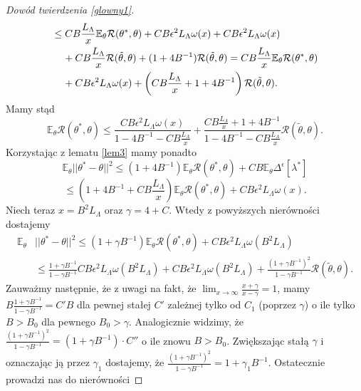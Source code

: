 \documentclass[man,mfiu]{mgrwms}
\begin{document}
\begin{proof}[Dowód twierdzenia \ref{glowny1}]
\begin{displaymath}
\begin{split}
&\leq CB\frac{L_{\Lambda}}{x}\mathbb{E}_{\theta}\mathcal{R}(\theta^*,\theta)+CB\epsilon^2L_{\Lambda}\omega (x)
+CB\epsilon^2L_{\Lambda}\omega (x)\\
&\hspace{4mm}+CB\frac{L_{\Lambda}}{x}\mathcal{R}(\tilde{\theta},\theta)+(1+4B^{-1})\mathcal{R}(\tilde{\theta},\theta)
=CB\frac{L_{\Lambda}}{x}\mathbb{E}_{\theta}\mathcal{R}(\theta^*,\theta)\\
&\hspace{4mm}+CB\epsilon^2L_{\Lambda}\omega (x)+\left(CB\frac{L_{\Lambda}}{x}+1+4B^{-1}\right)\mathcal{R}(\tilde{\theta},\theta).
\end{split}
\end{displaymath}
Mamy stąd
\begin{displaymath}
\mathbb{E}_{\theta}\mathcal{R}(\theta^*,\theta)\leq \frac{CB\epsilon^2L_{\Lambda}\omega (x)}{1-4B^{-1}-CB\frac{L_{\Lambda}}{x}}+\frac{CB\frac{L_{\Lambda}}{x}+1+4B^{-1}}{1-4B^{-1}-CB\frac{L_{\Lambda}}{x}}\mathcal{R}(\tilde{\theta},\theta).
\end{displaymath}
Korzystając z lematu \ref{lem3} mamy ponadto
\begin{displaymath}
\mathbb{E}_{\theta}||\theta^*-\theta||^2\leq (1+4B^{-1})\mathbb{E}_{\theta}\mathcal{R}(\theta^*,\theta)+CB\mathbb{E}_{\theta}\Delta^{\epsilon}[\lambda^*]
\end{displaymath}
\begin{displaymath}
\leq (1+4B^{-1}+CB\frac{L_{\Lambda}}{x})\mathbb{E}_{\theta}\mathcal{R}(\theta^*,\theta)+CB\epsilon^2L_{\Lambda}\omega (x).
\end{displaymath}
Niech teraz $x=B^2L_{\Lambda}$ oraz $\gamma=4+C$. Wtedy z powyższych nierówności dostajemy 
\begin{displaymath}
\begin{split}
\mathbb{E}_{\theta}&||\theta^*-\theta||^2\leq (1+\gamma B^{-1})\mathbb{E}_{\theta}\mathcal{R}(\theta^*,\theta)+CB\epsilon^2L_{\Lambda}\omega (B^2L_{\Lambda})\\
&\leq \frac{1+\gamma B^{-1}}{1-\gamma B^{-1}}CB\epsilon^2L_{\Lambda}\omega (B^2L_{\Lambda})+CB\epsilon^2L_{\Lambda}\omega (B^2L_{\Lambda})+\frac{(1+\gamma B^{-1})^2}{1-\gamma B^{-1}}\mathcal{R}(\tilde{\theta},\theta).
\end{split}
\end{displaymath}
Zauważmy następnie, że z uwagi na fakt, że $\lim_{x\to \infty}\frac{x+\gamma}{x-\gamma}=1$, mamy 
$B\frac{1+\gamma B^{-1}}{1-\gamma B^{-1}}=C'B$ dla pewnej stałej $C'$ zależnej tylko od $C_1$ (poprzez $\gamma$) o ile tylko $B>B_0$ dla pewnego $B_0>\gamma$. Analogicznie widzimy, że  $\frac{(1+\gamma B^{-1})^2}{1-\gamma B^{-1}}=(1+\gamma B^{-1})\cdot C''$ o ile znowu $B>B_0$. Zwiększając stałą $\gamma$ i oznaczając ją przez $\gamma_1$ dostajemy, że $\frac{(1+\gamma B^{-1})^2}{1-\gamma B^{-1}}=1+\gamma_1B^{-1}$. Ostatecznie prowadzi nas do nierówności 

\end{proof}
\end{document}

